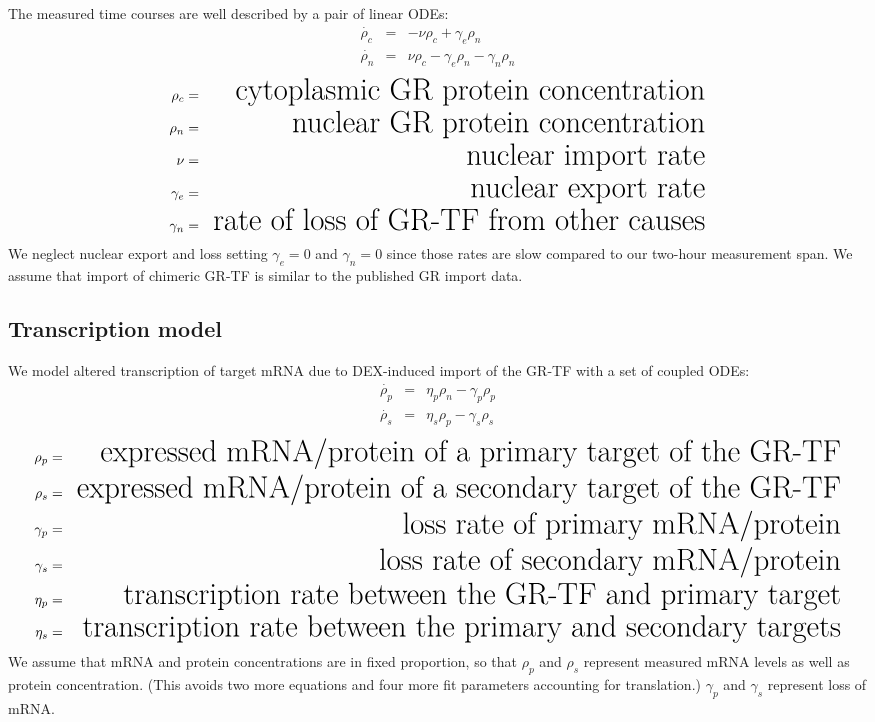 \documentclass[aspb,landscape]{a0poster}
\begin{document}
\begin{multicols}{4}
  The measured time courses are well described by a pair of linear ODEs:
  \begin{eqnarray*}\label{eq:rho_c_de}
    \dot{\rho_c} &=& -\nu \rho_c + \gamma_e \rho_n \\
    \dot{\rho_n} &=&  \nu \rho_c - \gamma_e \rho_n - \gamma_n \rho_n
  \end{eqnarray*}
  \begin{eqnarray*}
    \rho_c &=& \text{\small cytoplasmic GR protein concentration} \\
    \rho_n &=& \text{\small nuclear GR protein concentration} \\
    \nu &=& \text{\small nuclear import rate} \\
    \gamma_e &=& \text{\small nuclear export rate} \\
    \gamma_n &=& \text{\small rate of loss of GR-TF from other causes}
  \end{eqnarray*}
  We neglect nuclear export and loss setting $\gamma_e=0$ and $\gamma_n=0$ since those rates are slow compared to our two-hour measurement span.
  We assume that import of chimeric GR-TF is similar to the published GR import data.

  \subsection*{Transcription model}

  We model altered transcription of target mRNA due to DEX-induced import of the GR-TF with a set of coupled ODEs:
  \begin{eqnarray*}
    \dot{\rho_p} &=& \eta_p \rho_n  - \gamma_p \rho_p  \\
    \dot{\rho_s} &=& \eta_s \rho_p  - \gamma_s \rho_s 
  \end{eqnarray*}
  \begin{eqnarray*}
    \rho_p &=& \text{\small expressed mRNA/protein of a primary target of the GR-TF} \\
    \rho_s &=& \text{\small expressed mRNA/protein of a secondary target of the GR-TF} \\
    \gamma_p &=& \text{\small loss rate of primary mRNA/protein} \\
    \gamma_s &=& \text{\small loss rate of secondary mRNA/protein} \\
    \eta_p &=& \text{\small transcription rate between the GR-TF and primary target} \\
    \eta_s &=& \text{\small transcription rate between the primary and secondary targets}
  \end{eqnarray*}
  We assume that mRNA and protein concentrations are in fixed proportion, so that $\rho_p$ and $\rho_s$ represent measured mRNA levels as well as protein concentration.
  (This avoids two more equations and four more fit parameters accounting for translation.)
  $\gamma_p$ and  $\gamma_s$ represent loss of mRNA.
  

\end{multicols}
\end{document}
